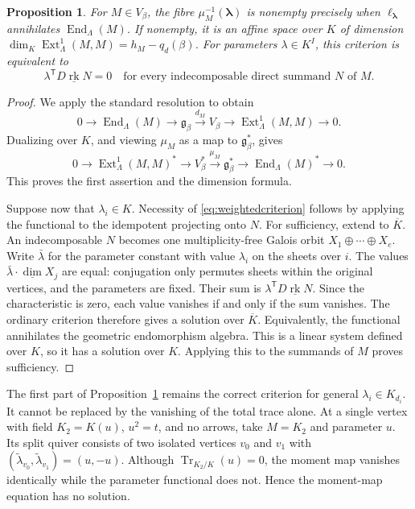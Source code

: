 \documentclass[11pt, reqno]{amsart}
\numberwithin{equation}{section}
\newtheorem{proposition}[theorem]{Proposition}
\theoremstyle{definition}
\theoremstyle{remark}
\newcommand{\op}[1]{\operatorname{#1}}
\newcommand{\rk}{\underline{\op{rk}}}
\newcommand{\dimv}{\underline{\dim}}
\newcommand{\End}{\op{End}}
\newcommand{\Ext}{\op{Ext}}
\newcommand{\Tr}{\op{Tr}}
\newcommand{\Kbar}{\overline K}
\begin{document}
\begin{proposition}\label{prop:moment}
For $M\in V_\beta$, the fibre $\mu_M^{-1}(\boldsymbol\lambda)$ is
nonempty precisely when $\ell_{\boldsymbol\lambda}$ annihilates
$\End_\Lambda(M)$. If nonempty, it is an affine space over $K$ of
dimension $\dim_K\Ext^1_\Lambda(M,M)=h_M-q_d(\beta)$.
For parameters $\lambda\in K^I$, this criterion is equivalent to
\begin{equation}\label{eq:weightedcriterion} \lambda^{\mathsf T}D\rk N=0 \quad\text{for every indecomposable direct summand }N\text{ of }M.\end{equation}
\end{proposition}
\begin{proof}
We apply the standard resolution to obtain
\[ 0\longrightarrow\End_\Lambda(M)\longrightarrow\mathfrak g_\beta \xrightarrow{d_M}V_\beta\longrightarrow\Ext^1_\Lambda(M,M) \longrightarrow0. \]
Dualizing over $K$, and viewing $\mu_M$ as a map to
$\mathfrak g_\beta^*$, gives
\[ 0\longrightarrow\Ext^1_\Lambda(M,M)^*\longrightarrow V_\beta^* \xrightarrow{\mu_M}\mathfrak g_\beta^* \longrightarrow\End_\Lambda(M)^*\longrightarrow0. \]
This proves the first assertion and the dimension formula.

Suppose now that $\lambda_i\in K$. Necessity of
\eqref{eq:weightedcriterion} follows by applying the functional to the
idempotent projecting onto $N$. For sufficiency, extend to $\Kbar$.
An indecomposable $N$ becomes one multiplicity-free Galois orbit
$X_1\oplus\cdots\oplus X_e$. Write $\bar\lambda$ for the parameter
constant with value $\lambda_i$ on the sheets over $i$. The values
$\bar\lambda\cdot\dimv X_j$ are equal: conjugation only permutes
sheets within the original vertices, and the parameters are fixed.
Their sum is $\lambda^{\mathsf T}D\rk N$. Since the characteristic is
zero, each value vanishes if and only if the sum vanishes.
The ordinary criterion \cite[Theorem~8.1.3]{DWbook} therefore gives a
solution over $\Kbar$. Equivalently, the functional annihilates the
geometric endomorphism algebra. This is a linear system defined over
$K$, so it has a solution over $K$. Applying this to the summands of
$M$ proves sufficiency.
\end{proof}

The first part of Proposition~\ref{prop:moment} remains the correct
criterion for general $\lambda_i\in K_{d_i}$. It cannot be replaced
by the vanishing of the total trace alone. At a single vertex with field
$K_2=K(u)$, $u^2=t$, and no arrows, take $M=K_2$ and parameter $u$.
Its split quiver consists of two isolated vertices $v_0$ and $v_1$
with $(\widetilde\lambda_{v_0},\widetilde\lambda_{v_1})=(u,-u)$.
Although $\Tr_{K_2/K}(u)=0$, the moment map vanishes identically
while the parameter functional does not. Hence the moment-map equation
has no solution.
\end{document}
